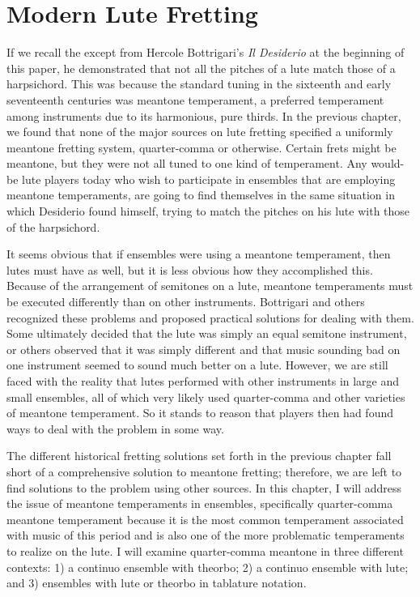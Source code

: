 \chapter{Modern Lute Fretting}

If we recall the except from Hercole Bottrigari's \textit{Il Desiderio} at the
beginning of this paper, he demonstrated that not all the pitches of a lute
match  those of a harpsichord.  This was because the standard tuning in the
sixteenth and early seventeenth centuries was meantone temperament, a preferred
temperament among instruments due to its harmonious, pure thirds. In the previous 
chapter, we found that none of the major sources on lute fretting specified a
uniformly meantone fretting system, quarter-comma or otherwise.
Certain frets might be meantone, but they were not all tuned to one
kind of temperament.  Any would-be lute players today who wish to participate in
ensembles that are employing meantone temperaments, are going to find themselves
in the same situation in which Desiderio found himself, trying to match the
pitches on his lute with those of the harpsichord.  

It seems obvious that if ensembles were using a meantone temperament, then
lutes must have as well, but it is less obvious how they accomplished this.
Because of the arrangement of semitones on a lute, meantone temperaments must be
executed differently than on other instruments.  Bottrigari and others
recognized these problems and proposed practical solutions for dealing with them.
Some ultimately decided that the lute was simply an equal semitone instrument, or
others observed that it was simply different and that music sounding bad on one
instrument seemed to sound much better on a lute.\autocite[45]{ML:1}  However,
we are still faced with the reality that lutes performed with other instruments
in large and small ensembles, all of which very likely used quarter-comma and
other varieties of meantone temperament.  So it stands to reason that players
then had found ways to deal with the problem in some way.

The different historical fretting solutions set forth in the previous chapter
fall short of a comprehensive solution to meantone fretting; therefore, we are
left to find solutions to the problem using other sources. In this chapter, I
will address the issue of meantone temperaments in ensembles, specifically
quarter-comma meantone temperament because it is the most common temperament
associated with music of this period and is also one of the more problematic
temperaments to realize on the lute. I will examine quarter-comma meantone in
three different contexts: 1) a continuo ensemble with theorbo; 2) a continuo
ensemble with lute; and 3) ensembles with lute or theorbo in tablature notation.

